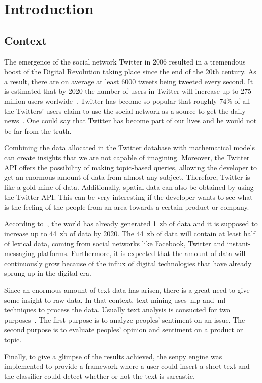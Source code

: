 \chapter{Introduction}

\section{Context}
The emergence of the social network Twitter in 2006 resulted in a tremendous boost of the Digital Revolution taking place since the end of the 20th century. As a result, there are on average at least 6000 tweets being tweeted every second. It is estimated that by 2020 the number of users in Twitter will increase up to 275 million users worlwide~\cite{twitter1}. Twitter has become so popular that roughly 74\% of all the Twitters' users claim to use the social network as a source to get the daily news~\cite{twitter2}. One could say that Twitter has become part of our lives and he would not be far from the truth.\par

 Combining the data allocated in the Twitter database with mathematical models can create insights that we are not capable of imagining. Moreover, the Twitter API offers the possibility of making topic-based queries, allowing the developer to get an enormous amount of data from almost any subject. Therefore, Twitter is like a gold mine of data. Additionally, spatial data can also be obtained by using the Twitter API. This can be very interesting if the developer wants to see what is the feeling of the people from an area towards a certain product or company. \par
According to~\cite{shayaa2018sentiment}, the world has already generated 1~\ac{zb} of data and it is supposed to increase up to 44~\ac{zb} of data by 2020. The 44~\ac{zb} of data will contain at least half of lexical data, coming from social networks like Facebook, Twitter and instant-messaging platforms. Furthermore, it is expected that the amount of data will continuously grow because of the influx of digital technologies that have already sprung up in the digital era.\par
Since an enormous amount of text data has arisen, there is a great need to give some insight to raw data. In that context, text mining uses~\ac{nlp} and~\ac{ml} techniques to process the data. Usually text analysis is consucted for two purposes~\cite{shayaa2018sentiment}. The first purpose is to analyze peoples' sentiment on an issue. The second purpose is to evaluate peoples' opinion and sentiment on a product or topic.\par
Finally, to give a glimpse of the results achieved, the senpy engine was implemented to provide a framework where a user could insert a short text and the classifier could detect whether or not the text is sarcastic.
